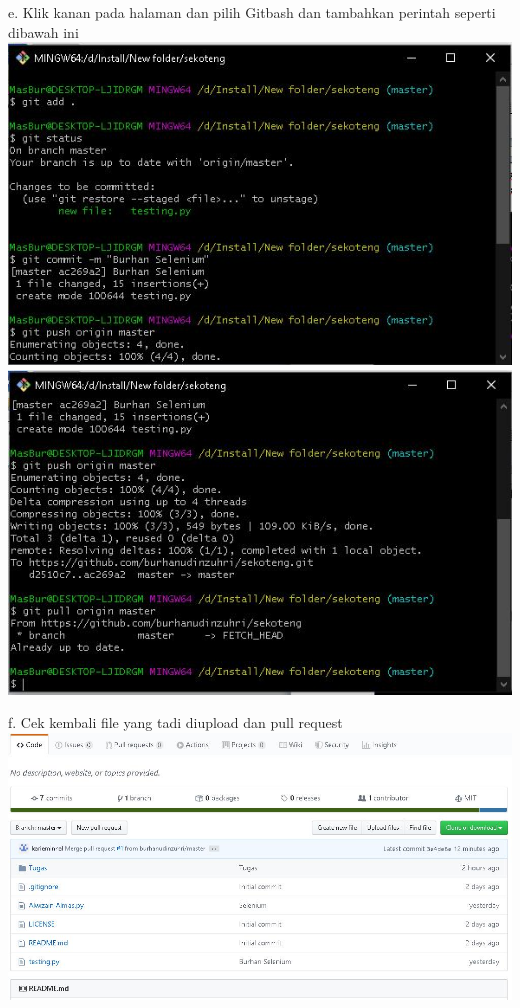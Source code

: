 \documentclass{article}
\begin{document}
                \newline
            \item e. Klik kanan pada halaman dan pilih Gitbash dan tambahkan perintah seperti dibawah ini
                \newline
                \includegraphics[scale=0.4]{33.3e1.jpg}
                \newline
                \includegraphics[scale=0.4]{33.3e2.jpg}
                \newline
            \item f. Cek kembali file yang tadi diupload dan pull request
                \newline
                \includegraphics[scale=0.4]{33.3f.jpg}
                \newline
\end{document}
